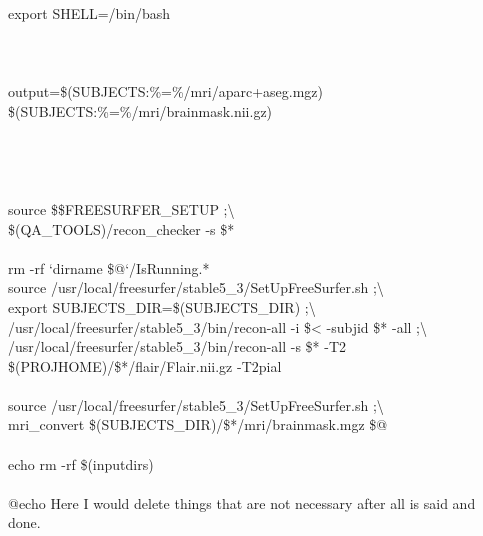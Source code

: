 \begin{makefileread}
export SHELL=/bin/bash \\

 \\

 \\

 \\

output=\$(SUBJECTS:\%=\%/mri/aparc+aseg.mgz) \$(SUBJECTS:\%=\%/mri/brainmask.nii.gz) \\
 \\

 \\

 \\

 \\
\tab source \$\$FREESURFER_SETUP  ;\textbackslash \\
\tab \$(QA_TOOLS)/recon_checker -s \$* \\

 \\
\tab rm -rf `dirname \$@`/IsRunning.* \\
\tab source /usr/local/freesurfer/stable5_3/SetUpFreeSurfer.sh  ;\textbackslash \\
\tab export SUBJECTS_DIR=\$(SUBJECTS_DIR)  ;\textbackslash \\
\tab /usr/local/freesurfer/stable5_3/bin/recon-all -i \$< -subjid \$* -all  ;\textbackslash \\
\tab /usr/local/freesurfer/stable5_3/bin/recon-all -s \$* -T2 \$(PROJHOME)/\$*/flair/Flair.nii.gz -T2pial \\

 \\
\tab source /usr/local/freesurfer/stable5_3/SetUpFreeSurfer.sh  ;\textbackslash \\
\tab mri_convert \$(SUBJECTS_DIR)/\$*/mri/brainmask.mgz \$@ \\

 \\
\tab echo rm -rf \$(inputdirs) \\

 \\
\tab @echo Here I would delete things that are not necessary after all is said and done. \\


\end{makefileread}
